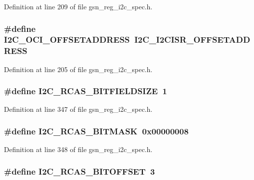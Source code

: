 Definition at line 209 of file gsn\_\-reg\_\-i2c\_\-spec.h.

\hypertarget{a00558_a07eeaa62355d88b241d6d9c0b26c7e51}{
\subsubsection[{I2C\_\-OCI\_\-OFFSETADDRESS}]{\setlength{\rightskip}{0pt plus 5cm}\#define I2C\_\-OCI\_\-OFFSETADDRESS~I2C\_\-I2CISR\_\-OFFSETADDRESS}}
\label{a00558_a07eeaa62355d88b241d6d9c0b26c7e51}


Definition at line 205 of file gsn\_\-reg\_\-i2c\_\-spec.h.

\hypertarget{a00558_a7c50810f0b7080927725dd2c87b46c7c}{
\subsubsection[{I2C\_\-RCAS\_\-BITFIELDSIZE}]{\setlength{\rightskip}{0pt plus 5cm}\#define I2C\_\-RCAS\_\-BITFIELDSIZE~1}}
\label{a00558_a7c50810f0b7080927725dd2c87b46c7c}


Definition at line 347 of file gsn\_\-reg\_\-i2c\_\-spec.h.

\hypertarget{a00558_a7eceaae599c8b900a45c3f8d1aa21705}{
\subsubsection[{I2C\_\-RCAS\_\-BITMASK}]{\setlength{\rightskip}{0pt plus 5cm}\#define I2C\_\-RCAS\_\-BITMASK~0x00000008}}
\label{a00558_a7eceaae599c8b900a45c3f8d1aa21705}


Definition at line 348 of file gsn\_\-reg\_\-i2c\_\-spec.h.

\hypertarget{a00558_a51984dce8b149e95f198ac0480dd6b58}{
\subsubsection[{I2C\_\-RCAS\_\-BITOFFSET}]{\setlength{\rightskip}{0pt plus 5cm}\#define I2C\_\-RCAS\_\-BITOFFSET~3}}
\label{a00558_a51984dce8b149e95f198ac0480dd6b58}


